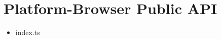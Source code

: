 \section{Platform-Browser Public API}









\begin{itemize}
  \item index.ts
\end{itemize}












